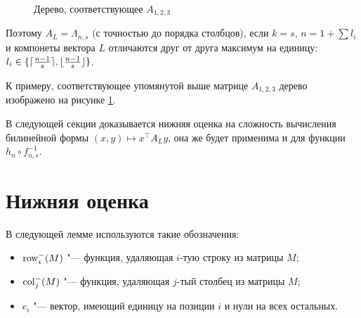 \documentclass[a4paper, 14pt]{extarticle}
\begin{document}
\begin{figure}[h]
\centering
{}
\caption{Дерево, соответствующее $A_{1, 2, 3}$}
\label{fig_last_tree}
\end{figure}

Поэтому $A_L = \Lambda_{n, s}$ (с точностью до порядка столбцов), если $k = s$,
$n = 1 + \sum l_i$ и компонеты вектора $L$ отличаются друг от друга максимум на
единицу: $l_i \in \{\lceil\frac {n-1} s\rceil, \lfloor\frac {n-1} s\rfloor\}$.

К примеру, соответствующее упомянутой выше матрице $A_{1,2,3}$ дерево изображено
на рисунке \ref{fig_last_tree}.

В следующей секции доказывается нижняя оценка на сложность вычисления билинейной
формы $(x, y) \mapsto x^\top A_L y$, она же будет применима и для функции $h_n
\circ f_{n, s}^{-1}$.

\section{Нижняя оценка}
\label{sec_bound}

В следующей лемме используются такие обозначения:
\begin{itemize}
\item $\operatorname{row}^-_i(M)$ "--- функция, удаляющая $i$-тую строку из матрицы $M$;
\item $\operatorname{col}^-_j(M)$ "--- функция, удаляющая $j$-тый столбец из матрицы $M$;
\item $e_i$ "--- вектор, имеющий единицу на позиции $i$ и нули на всех остальных.
\end{itemize}
\end{document}
